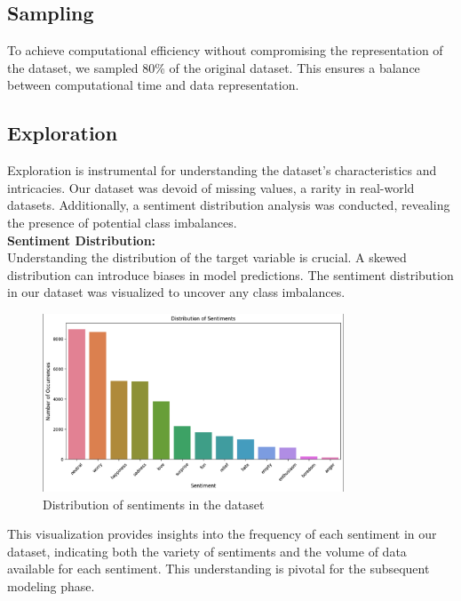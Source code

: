 \documentclass[12pt]{article}
\begin{document}
\subsection{Sampling}
To achieve computational efficiency without compromising the representation of the dataset, we sampled 80\% of the original dataset. This ensures a balance between computational time and data representation.

\subsection{Exploration}
Exploration is instrumental for understanding the dataset's characteristics and intricacies. Our dataset was devoid of missing values, a rarity in real-world datasets. Additionally, a sentiment distribution analysis was conducted, revealing the presence of potential class imbalances.\\

\textbf{Sentiment Distribution:}\\
Understanding the distribution of the target variable is crucial. A skewed distribution can introduce biases in model predictions. The sentiment distribution in our dataset was visualized to uncover any class imbalances.

\begin{figure}[H]

\centering
\includegraphics[width=0.8\textwidth]{path_to_sentiment_distribution.png}
\caption{Distribution of sentiments in the dataset}
\end{figure}

This visualization provides insights into the frequency of each sentiment in our dataset, indicating both the variety of sentiments and the volume of data available for each sentiment. This understanding is pivotal for the subsequent modeling phase.
\end{document}
